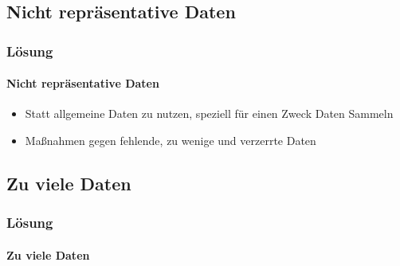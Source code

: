 \subsection{Nicht repräsentative Daten}
\begin{frame}
\frametitle{Lösung}
\framesubtitle{Nicht repräsentative Daten}
\begin{itemize}[<+(1)->]
	\item Statt allgemeine Daten zu nutzen, speziell für einen Zweck Daten Sammeln
	\item Maßnahmen gegen fehlende, zu wenige und verzerrte Daten
\end{itemize}
\end{frame}

\subsection{Zu viele Daten}
\begin{frame}
\frametitle{Lösung}
\framesubtitle{Zu viele Daten}
\end{frame}
